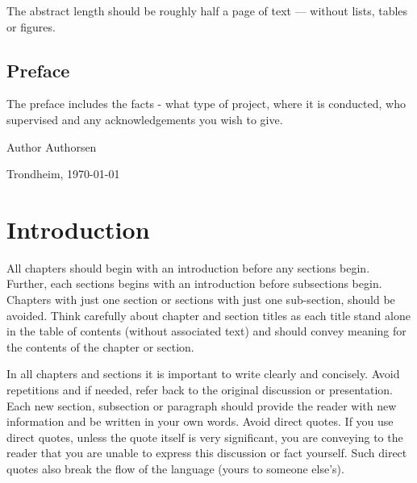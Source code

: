 \documentclass[a4paper]{book}
\newcommand{\thesisAuthor}{Author Authorsen}
\begin{document}
The abstract length should be roughly half a page of text --- without lists, tables or figures.  

\clearpage

\section*{Preface}



\vspace{1cm}

The preface includes the facts - what type of project, where it is conducted, who supervised and any acknowledgements you wish to give. 

\vfill

\hfill \thesisAuthor

\hfill Trondheim, \today

\clearpage

\tableofcontents

\listoffigures

\listoftables

\mainmatter

\chapter{Introduction}
\label{cha:Introduction}



All chapters should begin with an introduction before any sections begin. Further, each sections begins with an introduction before  subsections begin. Chapters with just one section or sections with just one sub-section, should be avoided. Think carefully about chapter and section titles as each title stand alone in the table of contents (without associated text) and should convey meaning for the contents of the chapter or section. 

In all chapters and sections it is important to write clearly and concisely. Avoid repetitions and if needed, refer back to the original discussion or presentation. Each new section, subsection or paragraph should provide the reader with new information and be written in your own words. Avoid direct quotes. If you use direct quotes, unless the quote itself is very significant, you are conveying to the reader that you are unable to express this discussion or fact yourself. Such direct quotes also break the flow of the language (yours to someone else's).   
\end{document}
